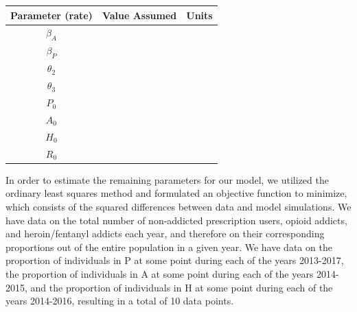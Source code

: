 \documentclass[12pt]{article}
\begin{document}
\begin{center}

\begin{tabular}{|c | c | c|}

 \hline

{Parameter (rate)} & {Value Assumed} & {Units} \\ [0.5ex]

 \hline\hline

$\beta_A$ &  &  \\

\hline

$\beta_P$&  &  \\

\hline

$\theta_2$ &  &  \\

\hline

$\theta_3$ &  &  \\

\hline


$P_0$ &  &  \\

\hline

$A_0$ &  &  \\

\hline

$H_0$ &  &  \\

\hline

$R_0$ &  &  \\

\hline
\end{tabular}

\end{center}
 


In order to estimate the remaining parameters for our model, we utilized the ordinary least squares method and formulated an objective function to minimize, which consists of the squared differences between data and model simulations. We have data on the total number of non-addicted prescription users, opioid addicts, and heroin/fentanyl addicts each year, and therefore on their corresponding proportions out of the entire population in a given year. We have data on the proportion of individuals in P at some point during each of the years 2013-2017, the proportion of individuals in A at some point during each of the years 2014-2015, and the proportion of individuals in H at some point during each of the years 2014-2016, resulting in a total of 10 data points. \\
\end{document}
